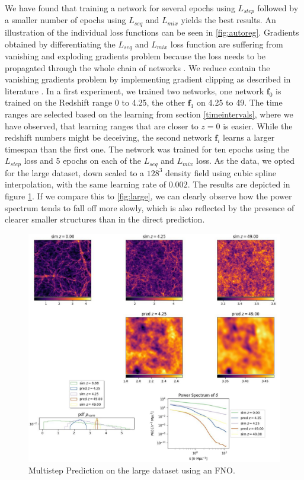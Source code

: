 \documentclass{article}
\begin{document}
We have found that training a network for several epochs using $L_{step}$ followed by a smaller number of epochs using $L_{seq}$ and $L_{mix}$ yields the best results. An illustration of the individual loss functions can be seen in \ref{fig:autoreg}. Gradients obtained by differentiating the $L_{seq}$ and $L_{mix}$ loss function are suffering from vanishing and exploding gradients problem because the loss needs to be propagated through the whole chain of networks \citep{thuerey2021physics}. We reduce contain the vanishing gradients problem by implementing gradient clipping as described in literature \citep{zhang2019gradient}. In a first experiment, we trained two networks, one network $\mathbf{f}_0$ is trained on the Redshift range 0 to 4.25, the other  $\mathbf{f}_1$ on 4.25 to 49. The time ranges are selected based on the learning from section \ref{timeintervals}, where we have observed, that learning ranges that are closer to $z=0$ is easier. While the redshift numbers might be deceiving, the second network  $\mathbf{f}_i$ learns a larger timespan than the first one. The network was trained for ten epochs using the $L_{step}$ loss and 5 epochs on each of the $L_{seq}$ and $L_{mix}$ loss. As the data, we opted for the large dataset, down scaled to a $128^3$ density field using cubic spline interpolation, with the same learning rate of $0.002$. The results are depicted in figure \ref{fig:multistep}. If we compare this to \ref{fig:large}, we can clearly observe how the power spectrum tends to fall off more slowly, which is also reflected by the presence of clearer smaller structures than in the direct prediction. 

\begin{figure}[h]
    \centering
    \includegraphics[width=0.9\linewidth]{img/multistep_large.jpg}
    \caption{Multistep Prediction on the large dataset using an FNO.}
    \label{fig:multistep}
\end{figure}
\end{document}
